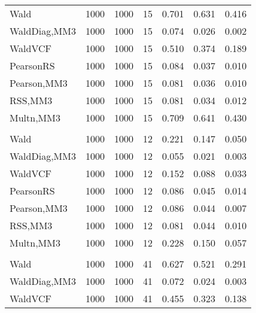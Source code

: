 \documentclass[
]{article}
\begin{document}
\begin{table}[H]
{\begin{tabular}[t]{lrrrrrr}
\hspace{1em}Wald & 1000 & 1000 & 15 & 0.701 & 0.631 & 0.416\\
\hspace{1em}WaldDiag,MM3 & 1000 & 1000 & 15 & 0.074 & 0.026 & 0.002\\
\hspace{1em}WaldVCF & 1000 & 1000 & 15 & 0.510 & 0.374 & 0.189\\
\hspace{1em}PearsonRS & 1000 & 1000 & 15 & 0.084 & 0.037 & 0.010\\
\hspace{1em}Pearson,MM3 & 1000 & 1000 & 15 & 0.081 & 0.036 & 0.010\\
\hspace{1em}RSS,MM3 & 1000 & 1000 & 15 & 0.081 & 0.034 & 0.012\\
\hspace{1em}Multn,MM3 & 1000 & 1000 & 15 & 0.709 & 0.641 & 0.430\\
\addlinespace[0.3em]
\multicolumn{7}{l}{\textbf{2F 10V}}\\
\hspace{1em}Wald & 1000 & 1000 & 12 & 0.221 & 0.147 & 0.050\\
\hspace{1em}WaldDiag,MM3 & 1000 & 1000 & 12 & 0.055 & 0.021 & 0.003\\
\hspace{1em}WaldVCF & 1000 & 1000 & 12 & 0.152 & 0.088 & 0.033\\
\hspace{1em}PearsonRS & 1000 & 1000 & 12 & 0.086 & 0.045 & 0.014\\
\hspace{1em}Pearson,MM3 & 1000 & 1000 & 12 & 0.086 & 0.044 & 0.007\\
\hspace{1em}RSS,MM3 & 1000 & 1000 & 12 & 0.081 & 0.044 & 0.010\\
\hspace{1em}Multn,MM3 & 1000 & 1000 & 12 & 0.228 & 0.150 & 0.057\\
\addlinespace[0.3em]
\multicolumn{7}{l}{\textbf{3F 15V}}\\
\hspace{1em}Wald & 1000 & 1000 & 41 & 0.627 & 0.521 & 0.291\\
\hspace{1em}WaldDiag,MM3 & 1000 & 1000 & 41 & 0.072 & 0.024 & 0.003\\
\hspace{1em}WaldVCF & 1000 & 1000 & 41 & 0.455 & 0.323 & 0.138\\

\end{tabular}}
\end{table}
\end{document}
